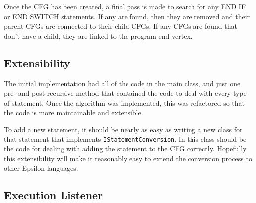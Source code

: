 

Once the CFG has been created, a final pass is made to search for any END IF or END SWITCH statements. If any are found, then they are removed and their parent CFGs are connected to their child CFGs. If any CFGs are found that don't have a child, they are linked to the program end vertex.

\subsection{Extensibility}


The initial implementation had all of the code in the main class, and just one pre- and post-recursive method that contained the code to deal with every type of statement. Once the algorithm was implemented, this was refactored so that the code is more maintainable and extensible.

To add a new statement, it should be nearly as easy as writing a new class for that statement that implements \verb|IStatementConversion|. In this class should be the code for dealing with adding the statement to the CFG correctly. Hopefully this extensibility will make it reasonably easy to extend the conversion process to other Epsilon languages.

\subsection{Execution Listener}

